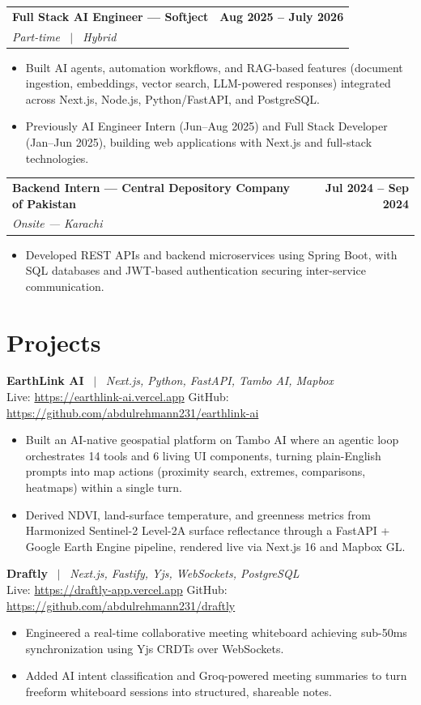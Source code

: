 \documentclass[letterpaper,10pt]{article}
\makeatletter
\newcommand{\ROLEBEFORE}{0pt}\newcommand{\ROLEAFTER}{1.5pt}
\newcommand{\role}[3]{%
  \vspace{\ROLEBEFORE}\begin{tabular*}{\textwidth}{l@{\extracolsep{\fill}}r}
    \textbf{#1} & \textbf{#2} \\
    \textit{#3} & \\
  \end{tabular*}\vspace{\ROLEAFTER}}
\newcommand{\project}[4]{%
  \vspace{-1pt}\textbf{#1} \ $|$ \ \textit{#2}\\
  Live: \href{#3}{#3} \qquad GitHub: \href{#4}{#4}\vspace{1pt}}
\makeatother
\begin{document}
\role{Full Stack AI Engineer --- Softject}{Aug 2025 -- July 2026}{Part-time \ $|$ \ Hybrid}
\begin{itemize}
  \item Built AI agents, automation workflows, and RAG-based features (document ingestion, embeddings, vector search, LLM-powered responses) integrated across Next.js, Node.js, Python/FastAPI, and PostgreSQL.
  \item Previously AI Engineer Intern (Jun--Aug 2025) and Full Stack Developer (Jan--Jun 2025), building web applications with Next.js and full-stack technologies.
\end{itemize}

\role{Backend Intern --- Central Depository Company of Pakistan}{Jul 2024 -- Sep 2024}{Onsite --- Karachi}
\begin{itemize}
  \item Developed REST APIs and backend microservices using Spring Boot, with SQL databases and JWT-based authentication securing inter-service communication.
\end{itemize}

\section{Projects}

\project{EarthLink AI}{Next.js, Python, FastAPI, Tambo AI, Mapbox}{https://earthlink-ai.vercel.app}{https://github.com/abdulrehmann231/earthlink-ai}
\begin{itemize}
  \item Built an AI-native geospatial platform on Tambo AI where an agentic loop orchestrates 14 tools and 6 living UI components, turning plain-English prompts into map actions (proximity search, extremes, comparisons, heatmaps) within a single turn.
  \item Derived NDVI, land-surface temperature, and greenness metrics from Harmonized Sentinel-2 Level-2A surface reflectance through a FastAPI + Google Earth Engine pipeline, rendered live via Next.js 16 and Mapbox GL.
\end{itemize}

\project{Draftly}{Next.js, Fastify, Yjs, WebSockets, PostgreSQL}{https://draftly-app.vercel.app}{https://github.com/abdulrehmann231/draftly}
\begin{itemize}
  \item Engineered a real-time collaborative meeting whiteboard achieving sub-50ms synchronization using Yjs CRDTs over WebSockets.
  \item Added AI intent classification and Groq-powered meeting summaries to turn freeform whiteboard sessions into structured, shareable notes.
\end{itemize}
\end{document}
